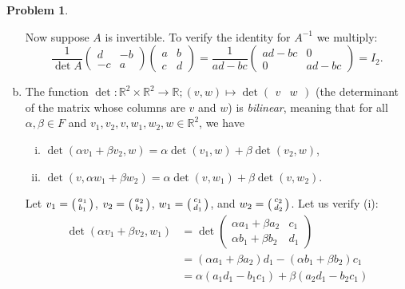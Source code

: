 \documentclass[11pt,oneside]{amsart}
\theoremstyle{definition}
\newtheorem{problem}{Problem}
\newcommand{\bR}{\mathbb{R}}
\newcommand*\colvec[1]{\begin{psmallmatrix}#1\end{psmallmatrix}}
\begin{document}
\begin{problem}
\begin{enumerate}[(a)]
\begin{solution}
                Now suppose $A$ is invertible. To verify the identity for $A^{-1}$ we multiply:
                \[\frac 1{\det A}\begin{pmatrix}
                    d&-b\\-c&a
                \end{pmatrix}\begin{pmatrix}
                    a&b\\c&d
                \end{pmatrix}=\frac 1{ad-bc}\begin{pmatrix}
                    ad-bc&0\\0&ad-bc
                \end{pmatrix}=I_2.\]
            \end{solution}
            \item The function $\det\colon \bR^2\times\bR^2\to\bR; (v,w)\mapsto \det\begin{pmatrix}
                v&w
            \end{pmatrix}$ (the determinant of the matrix whose columns are $v$ and $w$) is \emph{bilinear}, meaning that for all $\alpha,\beta\in F$ and $v_1,v_2,v,w_1,w_2,w\in\bR^2$, we have
            \begin{enumerate}[(i)]
                \item $\det(\alpha v_1+\beta v_2,w)=\alpha\det(v_1,w)+\beta\det(v_2,w)$,
                \item $\det(v,\alpha w_1+\beta w_2)=\alpha\det(v,w_1)+\beta\det(v,w_2)$.
            \end{enumerate}
            \begin{solution}
                Let $v_1=\colvec{a_1\\b_1}$, $v_2=\colvec{a_2\\b_2}$, $w_1=\colvec{c_1\\d_1}$, and $w_2=\colvec{c_2\\d_2}$. Let us verify (i):
                \[\begin{split}
                    \det(\alpha v_1+\beta v_2,w_1) &= \det\begin{pmatrix}
                        \alpha a_1+\beta a_2 & c_1\\
                        \alpha b_1+\beta b_2 & d_1
                    \end{pmatrix}\\
                    &= (\alpha a_1+\beta a_2)d_1-(\alpha b_1+\beta b_2)c_1\\
                    &= \alpha(a_1d_1-b_1c_1)+\beta(a_2d_1-b_2c_1)\\

\end{split}\]
\end{solution}
\end{enumerate}
\end{problem}
\end{document}
